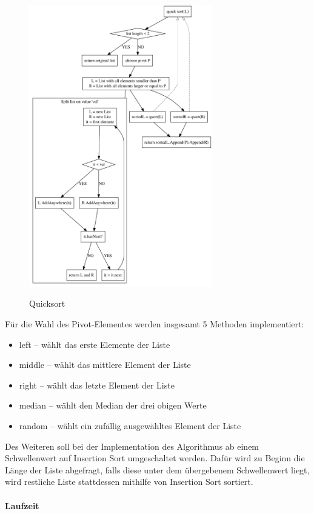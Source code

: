\begin{figure}[hbt]
    \caption{Quicksort}
    \centering
    \includegraphics[width = 8cm]{qsort.pdf}\label{fig:qsort}
\end{figure}

Für die Wahl des Pivot-Elementes werden insgesamt 5 Methoden implementiert:
\begin{itemize}
    \item left -- wählt das erste Elemente der Liste
    \item middle -- wählt das mittlere Element der Liste
    \item right -- wählt das letzte Element der Liste
    \item median -- wählt den Median der drei obigen Werte
    \item random -- wählt ein zufällig ausgewähltes Element der Liste
\end{itemize}

Des Weiteren soll bei der Implementation des Algorithmus ab einem
Schwellenwert auf Insertion Sort umgeschaltet werden.
Dafür wird zu Beginn die Länge der Liste abgefragt, falls diese unter dem
übergebenem Schwellenwert liegt, wird restliche Liste stattdessen
mithilfe von Insertion Sort sortiert.

\FloatBarrier

\paragraph{Laufzeit}\label{subsec:Qlaufzeit}

